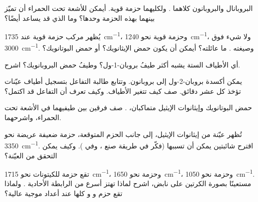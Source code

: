 \begin{exercise}[$\star\star$]\label{exo:g11:infrared:9}
البروبانال والبروبانون كلاهما . ولكليهما حزمة 
قوية. أيمكن للأشعة تحت الحمراء أن تميّز بينهما بهذه الحزمة وحدها؟ وما الذي
قد يساعد أيضًا؟
\end{exercise}

\begin{exercise}[$\star\star$]\label{exo:g11:infrared:10}
يُظهر مركب حزمة قوية عند \qty{1735}{cm^{-1}}، وحزمة قوية نحو
\qty{1240}{cm^{-1}}، ولا شيء فوق \qty{3000}{cm^{-1}}. وصيغته
. ما عائلته؟ أيمكن أن يكون حمض الإيثانويك؟ أو حمض
البوتانويك؟
\end{exercise}

\begin{exercise}[$\star\star$]\label{exo:g11:infrared:11}
أي الأطياف الستة يشبه أكثر طيفُ  بروبان-1-ول؟ وطيفُ حمض
البروبانويك؟ اشرح.
\end{exercise}

\begin{exercise}[$\star\star\star$]\label{exo:g11:infrared:12}
يمكن أكسدة بروبان-2-ول إلى بروبانون. وتتابع طالبة
التفاعل بتسجيل أطياف عيّنات تؤخذ كل عشر دقائق.
صف كيف تتغير الأطياف. وكيف تعرف أن التفاعل
قد اكتمل؟
\end{exercise}

\begin{exercise}[$\star\star\star$]\label{exo:g11:infrared:13}
حمض البوتانويك وإيثانوات الإيثيل متماكبان، . صف فرقين
بين طيفيهما في الأشعة تحت الحمراء، واشرحهما.
\end{exercise}

\begin{exercise}[$\star\star\star$]\label{exo:g11:infrared:14}
تُظهر عيّنة من إيثانوات الإيثيل، إلى جانب الحزم المتوقعة، حزمة ضعيفة
عريضة نحو \qty{3350}{cm^{-1}}. اقترح شائبتين يمكن أن
تسببها (فكّر في طريقة صنع ، وفي ). وكيف يمكن التحقق من
العيّنة؟
\end{exercise}

\begin{exercise}[$\star\star\star$]\label{exo:g11:infrared:15}
تقع حزمة  للكيتونات نحو \qty{1715}{cm^{-1}}، وحزمة
 نحو \qty{1650}{cm^{-1}}، وحزمة  نحو
\qty{1050}{cm^{-1}}. مستعينًا بصورة الكرتين على نابض، اشرح
لماذا تهتز   أسرع من الرابطة الأحادية .
ولماذا تقع حزم  و و كلها عند أعداد موجية عالية؟
\end{exercise}

